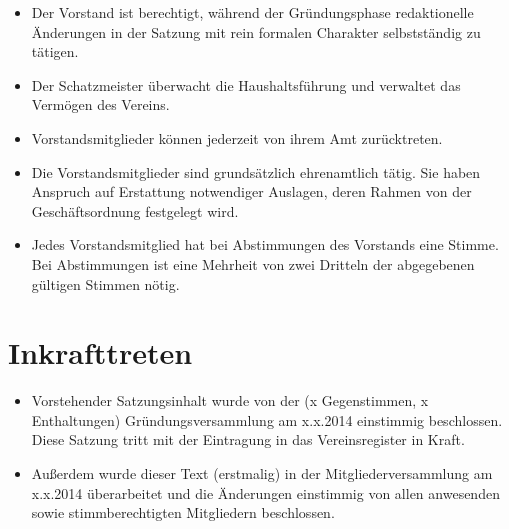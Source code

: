 \documentclass[a4paper,10pt]{article}
\begin{document}
\begin{itemize}
   \item Der Vorstand ist berechtigt, während der Gründungsphase redaktionelle Änderungen in der Satzung mit rein formalen Charakter selbstständig zu tätigen. 
   \item Der Schatzmeister überwacht die Haushaltsführung und verwaltet das Vermögen des Vereins.
   \item Vorstandsmitglieder können jederzeit von ihrem Amt zurücktreten.
   \item Die Vorstandsmitglieder sind grundsätzlich ehrenamtlich tätig. Sie haben Anspruch auf Erstattung notwendiger Auslagen, deren Rahmen von der Geschäftsordnung festgelegt wird.
   \item Jedes Vorstandsmitglied hat bei Abstimmungen des Vorstands eine Stimme. Bei Abstimmungen ist eine Mehrheit von zwei Dritteln der abgegebenen gültigen Stimmen nötig.
  \end{itemize}

\section{Inkrafttreten}
  \begin{itemize}
   \item Vorstehender Satzungsinhalt wurde von der (x Gegenstimmen, x Enthaltungen) Gründungsversammlung am x.x.2014 einstimmig beschlossen. Diese Satzung tritt mit der Eintragung in das Vereinsregister in Kraft. 
   \item Außerdem wurde dieser Text (erstmalig) in der Mitgliederversammlung am x.x.2014 überarbeitet und die Änderungen einstimmig von allen anwesenden sowie stimmberechtigten Mitgliedern beschlossen. 
  \end{itemize}

  
\end{document}
